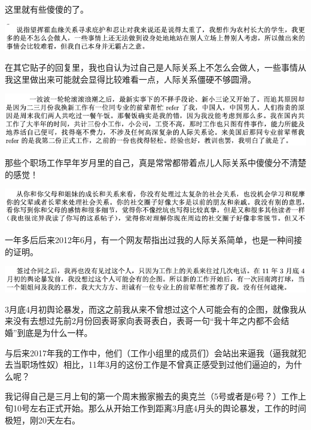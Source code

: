 \documentclass[9pt, b5paper]{article}
\begin{document}
这里就有些傻傻的了。

\begin{center}
\includegraphics[width=.9\linewidth]{./pic/backups_plans_20210412_114004.png}
\end{center}

在其它贴子的回复里，我也自认为过自己是人际关系上不怎么会做人，一些事情从我这里做出来可能就会显得比较难看一点，人际关系僵硬不够圆滑。

\begin{center}
\includegraphics[width=.9\linewidth]{./pic/backups_plans_20210412_114144.png}
\end{center}

那些个职场工作早年岁月里的自己，真是常常都带着点儿人际关系中傻傻分不清楚的感觉！

\begin{center}
\includegraphics[width=.9\linewidth]{./pic/backups_plans_20210412_114502.png}
\end{center}

一年多后后来2012年6月，有一个网友帮指出过我的人际关系简单，也是一种间接的证明。 

\begin{center}
\includegraphics[width=.9\linewidth]{./pic/backups_plans_20210412_104824.png}
\end{center}

3月底4月初舆论暴发，而这之前我从来不曾想过这个人可能会有的企图，就像我从来没有去想过先前2月份回表哥家向表哥表白，表哥一句“我十年之内都不会结婚”到底是为什么一样。 

与后来2017年我的工作中，他们（工作小组里的成员们）会站出来逼我（逼我就犯去当职场性奴）相比，11年3月的这份工作是不曾真正感受到过他们逼迫的，为什么呢？

我记得自己是三月上旬的第一个周末搬家搬去的奥克兰（5号或者是6号？）工作上旬10号左右正式开始。那么从开始工作到距离3月底4月头的舆论暴发，工作的时间极短，刚20天左右。
\end{document}
